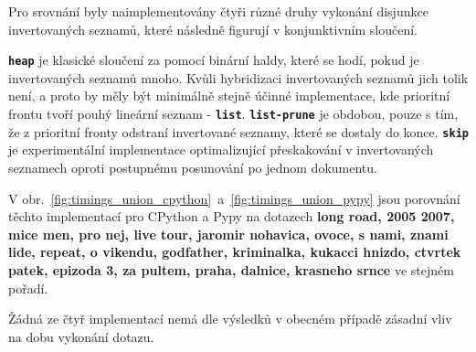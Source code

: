 \documentclass[11pt,letterpaper,oneside,openright]{book}
\newcommand{\bftt}[1]{\texttt{\textbf{#1}}}
\begin{document}
Pro srovnání byly naimplementovány čtyři různé druhy vykonání disjunkce
invertovaných seznamů, které následně figurují v konjunktivním sloučení.

\bftt{heap} je klasické sloučení za pomocí binární haldy, které se hodí, pokud
je invertovaných seznamů mnoho. Kvůli hybridizaci invertovaných seznamů jich
tolik není, a proto by měly být minimálně stejně účinné implementace, kde
prioritní frontu tvoří pouhý lineární seznam - \bftt{list}. \bftt{list-prune}
je obdobou, pouze s tím, že z prioritní fronty odstraní invertované seznamy,
které se dostaly do konce. \bftt{skip} je experimentální implementace
optimalizující přeskakování v invertovaných seznamech oproti postupnému
posunování po jednom dokumentu.

V obr.~\ref{fig:timings_union_cpython}~a~\ref{fig:timings_union_pypy} jsou
porovnání těchto implementací pro CPython a Pypy na dotazech \textbf{long road,
2005 2007, mice men, pro nej, live tour, jaromir nohavica, ovoce, s nami, znami
lide, repeat, o vikendu, godfather, kriminalka, kukacci hnizdo, ctvrtek patek,
epizoda 3, za pultem, praha, dalnice, krasneho srnce} ve stejném pořadí.

Žádná ze čtyř implementací nemá dle výsledků v obecném případě zásadní vliv na
dobu vykonání dotazu.
\end{document}

